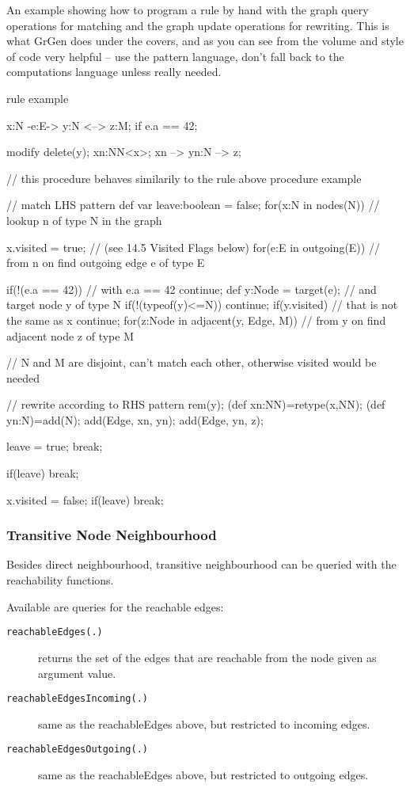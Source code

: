 \begin{example}
An example showing how to program a rule by hand with the graph query operations for matching and the graph update operations for rewriting. This is what GrGen does under the covers, and as you can see from the volume and style of code very helpful -- use the pattern language, don't fall back to the computations language unless really needed.
\begin{grgen}
rule example
{
	x:N -e:E-> y:N <--> z:M;
	if { e.a == 42; }

	modify {
		delete(y);
		xn:NN<x>;
		xn --> yn:N --> z;
	}
}
// this procedure behaves similarily to the rule above
procedure example
{
	// match LHS pattern
	def var leave:boolean = false;
	for(x:N in nodes(N)) // lookup n of type N in the graph
	{
		x.visited = true; // (see 14.5 Visited Flags below)
		for(e:E in outgoing(E)) // from n on find outgoing edge e of type E
		{
			if(!(e.a == 42)) { // with e.a == 42
				continue;
			}
			def y:Node = target(e); // and target node y of type N
			if(!(typeof(y)<=N)) {
				continue;
			}
			if(y.visited) { // that is not the same as x
				continue;
			}
			for(z:Node in adjacent(y, Edge, M)) // from y on find adjacent node z of type M
			{ // N and M are disjoint, can't match each other, otherwise visited would be needed
			
				// rewrite according to RHS pattern
				rem(y);
				(def xn:NN)=retype(x,NN);
				(def yn:N)=add(N);
				add(Edge, xn, yn);
				add(Edge, yn, z);

				leave = true; break;
			}
			if(leave) { break; }
		}
		x.visited = false;
		if(leave) { break; }
	}
}
\end{grgen}
\end{example}

\subsubsection*{Transitive Node Neighbourhood}\label{transitiveneighbour}

Besides direct neighbourhood, transitive neighbourhood can be queried with the reachability functions.

Available are queries for the reachable edges:

\begin{description}
\item[\texttt{reachableEdges(.)}] returns the set of the edges that are reachable from the node given as argument value.
\item[\texttt{reachableEdgesIncoming(.)}] same as the reachableEdges above, but restricted to incoming edges.
\item[\texttt{reachableEdgesOutgoing(.)}] same as the reachableEdges above, but restricted to outgoing edges.
\end{description}

